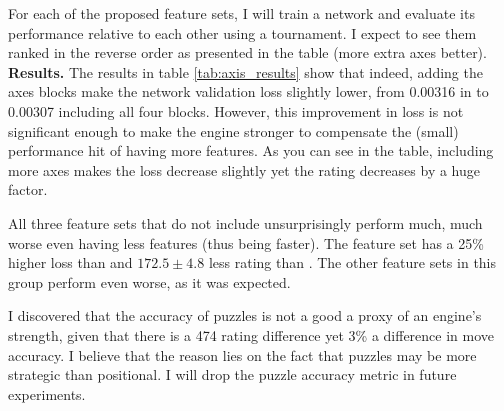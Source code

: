 For each of the proposed feature sets, I will train a network and evaluate its performance relative to each other using a tournament. I expect to see them ranked in the reverse order as presented in the table (more extra axes better). \\

\textbf{Results.} The results in table \ref{tab:axis_results} show that indeed, adding the axes blocks make the network validation loss slightly lower, from 0.00316 in  to 0.00307 including all four blocks. However, this improvement in loss is not significant enough to make the engine stronger to compensate the (small) performance hit of having more features. As you can see in the table, including more axes makes the loss decrease slightly yet the rating decreases by a huge factor.

All three feature sets that do not include  unsurprisingly perform much, much worse even having less features (thus being faster). The feature set  has a 25\% higher loss than  and $172.5 \pm 4.8$ less rating than . The other feature sets in this group perform even worse, as it was expected.

I discovered that the accuracy of puzzles is not a good a proxy of an engine's strength, given that there is a 474 rating difference yet 3\% a difference in move accuracy. I believe that the reason lies on the fact that puzzles may be more strategic than positional. I will drop the puzzle accuracy metric in future experiments.

